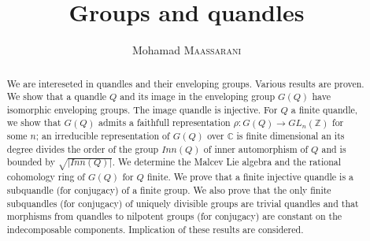 \documentclass[12pt, reqno]{amsart}
\newcommand{\Z}{ {\mathbb Z} }
\newcommand{\C}{ {\mathbb C} }
\begin{document}
 
\title{Groups and quandles}

 


 
\author{Mohamad \textsc{Maassarani} }
\maketitle
\begin{abstract}
We are intereseted in quandles and their enveloping groups. Various results are proven. We show that a quandle $Q$ and its image in the enveloping group $G(Q)$ have isomorphic enveloping groups. The image quandle is injective. For $Q$ a finite quandle, we show that $G(Q)$ admits a faithfull representation $\rho : G(Q)\to GL_n(\Z)$ for some $n$; an irreducible representation of $G(Q)$ over $\C$ is finite dimensional an its degree divides the order of the group $Inn(Q)$ of inner automorphism of $Q$ and is bounded by $\sqrt{\vert Inn(Q) \vert }$. We determine the Malcev Lie algebra and the rational cohomology ring of $G(Q)$ for $Q$ finite. We prove that a finite injective quandle is a subquandle (for conjugacy) of a finite group. We also prove that the only finite subquandles (for conjugacy) of uniquely divisible groups are trivial quandles and that morphisms from quandles to nilpotent groups (for conjugacy) are constant on the indecomposable components. Implication of these results are considered.  
\end{abstract}
\end{document}
